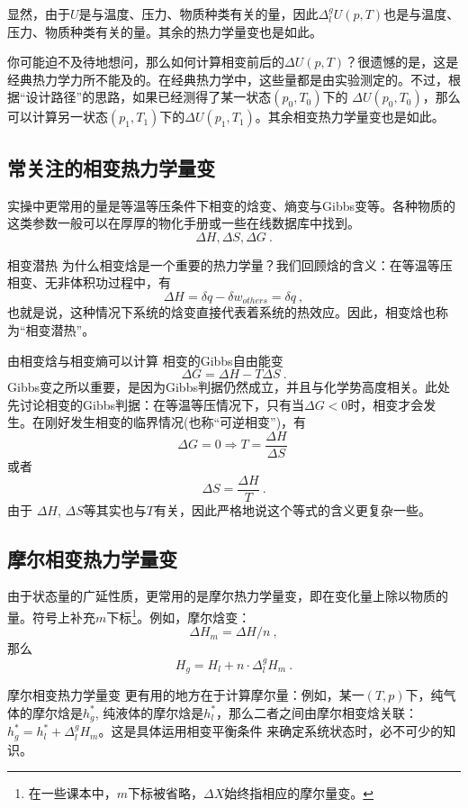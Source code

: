 显然，由于$U$是与温度、压力、物质种类有关的量，因此$\Delta ^ g_l U (p,T)$也是与温度、压力、物质种类有关的量。其余的热力学量变也是如此。

你可能迫不及待地想问，那么如何计算相变前后的$\Delta U (p,T)$？很遗憾的是，这是经典热力学力所不能及的。在经典热力学中，这些量都是由实验测定的。不过，根据“设计路径”的思路，如果已经测得了某一状态$(p_0,T_0)$下的 $\Delta U (p_0,T_0)$，那么可以计算另一状态$(p_1,T_1)$下的$\Delta U (p_1,T_1)$。其余相变热力学量变也是如此。

\subsection{常关注的相变热力学量变}
实操中更常用的量是等温等压条件下相变的焓变、熵变与Gibbs变等。各种物质的这类参数一般可以在厚厚的物化手册或一些在线数据库中找到。
$$
\Delta H, \Delta  S, \Delta G~.
$$

\begin{example}{相变潜热}
为什么相变焓是一个重要的热力学量？我们回顾焓的含义：在等温等压相变、无非体积功过程中，有
$$
\Delta H = \delta q - \delta w_{others} = \delta q~,
$$
也就是说，这种情况下系统的焓变直接代表着系统的热效应。因此，相变焓也称为“相变潜热”。
\end{example}

由相变焓与相变熵可以计算 相变的Gibbs自由能变
$$
\Delta G = \Delta H - T \Delta S~.
$$
Gibbs变之所以重要，是因为Gibbs判据仍然成立，并且与化学势高度相关。此处先讨论相变的Gibbs判据：在等温等压情况下，只有当$\Delta G<0$时，相变才会发生。在刚好发生相变的临界情况(也称“可逆相变”)，有
$$
\Delta G = 0 \Rightarrow T = \frac{\Delta H}{\Delta S}~
$$
或者
$$
\Delta S = \frac{\Delta H}{T}~.
$$
由于 $\Delta H$, $\Delta S$等其实也与$T$有关，因此严格地说这个等式的含义更复杂一些。

\subsection{摩尔相变热力学量变}
由于状态量的广延性质，更常用的是摩尔热力学量变，即在变化量上除以物质的量。符号上补充$m$下标\footnote{在一些课本中，$m$下标被省略，$\Delta X$始终指相应的摩尔量变。}。例如，摩尔焓变：
$$
\Delta H_m = \Delta H / n~,
$$
那么
$$
H_g = H_l + n \cdot \Delta^g_l H_m~.
$$

摩尔相变热力学量变 更有用的地方在于计算摩尔量：例如，某一$(T,p)$下，纯气体的摩尔焓是$h^*_g$, 纯液体的摩尔焓是$h^*_l$，那么二者之间由摩尔相变焓关联：$h^*_g = h^*_l + \Delta^g_l H_m$。这是具体运用相变平衡条件 来确定系统状态时，必不可少的知识。

